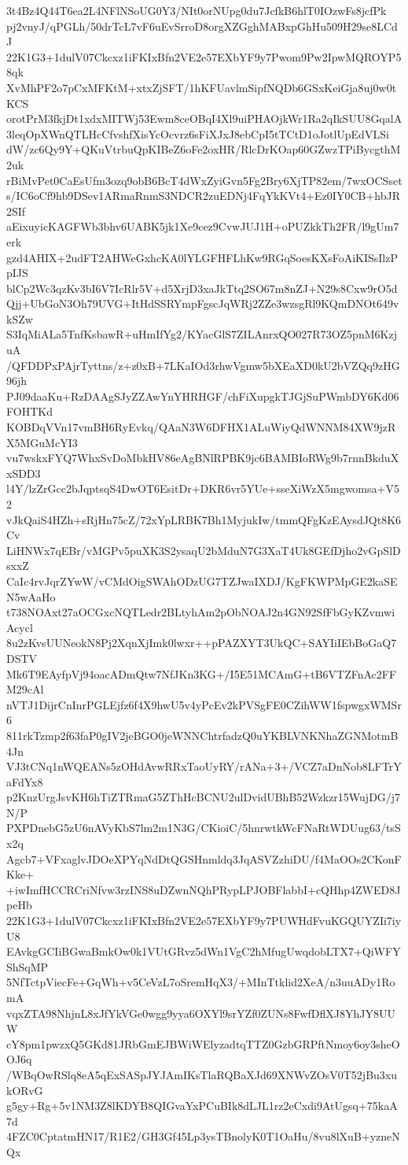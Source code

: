 3t4Bz4Q44T6ea2L4NFlNSoUG0Y3/NIt0orNUpg0du7JcfkB6hlT0IOzwFs8jcfPk
pj2vnyJ/qPGLh/50drTcL7vF6uEvSrroD8orgXZGghMABxpGhHu509H29se8LCdJ
22K1G3+1dulV07Ckcxz1iFKIxBfn2VE2e57EXbYF9y7Pwom9Pw2IpwMQROYP58qk
XvMhPF2o7pCxMFKtM+xtxZjSFT/1hKFUavlmSipfNQDb6GSxKeiGja8uj0w0tKCS
orotPrM3fkjDt1xdxMITWj53Ewm8ceOBqI4Xl9uiPHAOjkWr1Ra2qIkSUU8GqalA
3leqOpXWnQTLHcCfvshfXisYcOcvrz6sFiXJxJ8ebCpI5tTCtD1oJotlUpEdVLSi
dW/zc6Qy9Y+QKuVtrbuQpKIBeZ6oFe2oxHR/RlcDrKOap60GZwzTPiBycgthM2uk
rBiMvPet0CaEsUfm3ozq9obB6BcT4dWxZyiGvn5Fg2Bry6XjTP82em/7wxOCSset
s/IC6oCf9hb9DSev1ARmaRnmS3NDCR2zuEDNj4FqYkKVt4+Ez0IY0CB+hbJR2SIf
aEixuyicKAGFWb3bhv6UABK5jk1Xe9cez9CvwJUJ1H+oPUZkkTh2FR/l9gUm7erk
gzd4AHIX+2udFT2AHWeGxhcKA0lYLGFHFLhKw9RGqSoesKXsFoAiKISsIlzPpIJS
blCp2Wc3qzKv3bI6V7IcRlr5V+d5XrjD3xaJkTtq2SO67m8nZJ+N29s8Cxw9rO5d
Qjj+UbGoN3Oh79UVG+ItHdSSRYmpFgscJqWRj2ZZe3wzsgRl9KQmDNOt649vkSZw
S3IqMiALa5TnfKsbawR+uHmIfYg2/KYacGlS7ZILAnrxQO027R73OZ5pnM6KzjuA
/QFDDPxPAjrTyttns/z+z0xB+7LKaIOd3rhwVgmw5bXEaXD0kU2bVZQq9zHG96jh
PJ09daaKu+RzDAAgSJyZZAwYnYHRHGF/chFiXupgkTJGjSuPWmbDY6Kd06FOHTKd
KOBDqVVn17vmBH6RyEvkq/QAaN3W6DFHX1ALuWiyQdWNNM84XW9jzRX5MGuMcYI3
vu7wskxFYQ7WhxSvDoMbkHV86eAgBNlRPBK9jc6BAMBIoRWg9b7rnnBkduXxSDD3
l4Y/lzZrGcc2bJqptsqS4DwOT6EsitDr+DKR6vr5YUe+sseXiWzX5mgwomsa+V52
vJkQaiS4HZh+sRjHn75cZ/72xYpLRBK7Bh1MyjukIw/tmmQFgKzEAysdJQt8K6Cv
LiHNWx7qEBr/vMGPv5puXK3S2ysaqU2bMduN7G3XaT4Uk8GEfDjho2vGpSlDsxxZ
CaIc4rvJqrZYwW/vCMdOigSWAhODzUG7TZJwaIXDJ/KgFKWPMpGE2kaSEN5wAaHo
t738NOAxt27aOCGxcNQTLedr2BLtyhAm2pObNOAJ2n4GN92SfFbGyKZvmwiAcycl
8u2zKvsUUNeokN8Pj2XqnXjImk0lwxr++pPAZXYT3UkQC+SAYIiIEbBoGaQ7DSTV
Mk6T9EAyfpVj94oacADmQtw7NfJKn3KG+/I5E51MCAmG+tB6VTZFnAc2FFM29cAl
nVTJ1DijrCnInrPGLEjfz6f4X9hwU5v4yPcEv2kPVSgFE0CZihWW1fspwgxWMSr6
811rkTzmp2f63faP0gIV2jeBGO0jeWNNChtrfadzQ0uYKBLVNKNhaZGNMotmB4Jn
VJ3tCNq1nWQEANs5zOHdAvwRRxTaoUyRY/rANa+3+/VCZ7aDnNob8LFTrYaFdYx8
p2KnzUrgJsvKH6hTiZTRmaG5ZThHcBCNU2ulDvidUBhB52Wzkzr15WujDG/j7N/P
PXPDnebG5zU6nAVyKbS7lm2m1N3G/CKioiC/5hnrwtkWcFNaRtWDUug63/tsSx2q
Agcb7+VFxaglvJDOeXPYqNdDtQGSHnmldq3JqASVZzhiDU/f4MaOOs2CKonFKke+
+iwImfHCCRCriNfvw3rzINS8uDZwnNQhPRypLPJOBFlabbI+cQHhp4ZWED8JpeHb
22K1G3+1dulV07Ckcxz1iFKIxBfn2VE2e57EXbYF9y7PUWHdFvuKGQUYZIi7iyU8
EAvkgGCIiBGwaBmkOw0k1VUtGRvz5dWn1VgC2hMfugUwqdobLTX7+QiWFYShSqMP
5NfTctpViecFe+GqWh+v5CeVzL7oSremHqX3/+MInTtklid2XeA/n3uuADy1RomA
vqxZTA98NhjnL8xJfYkVGe0wgg9yya6OXYl9srYZf0ZUNs8FwfDflXJ8YhJY8UUW
cY8pm1pwzxQ5GKd81JRbGmEJBWiWElyzadtqTTZ0GzbGRPftNmoy6oy3sheOOJ6q
/WBqOwRSlq8eA5qExSASpJYJAmIKsTlaRQBaXJd69XNWvZOsV0T52jBu3xukORvG
g5gy+Rg+5v1NM3Z8lKDYB8QIGvaYxPCuBIk8dLJL1rz2eCxdi9AtUgsq+75kaA7d
4FZC0CptatmHN17/R1E2/GH3Gf45Lp3ysTBnolyK0T1OaHu/8vu8lXuB+yzneNQx
